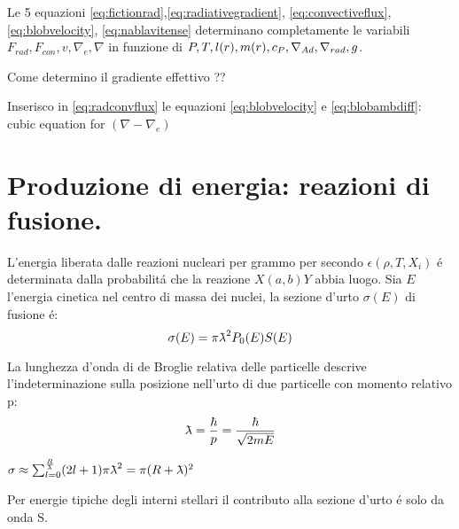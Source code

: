 \documentclass[../main.tex]{subfiles}
\begin{document}
\begin{errata}

Le 5 equazioni \eqref{eq:fictionrad},\eqref{eq:radiativegradient}, \eqref{eq:convectiveflux}, \eqref{eq:blobvelocity}, \eqref{eq:nablavitense} determinano completamente le variabili $F_{rad}, F_{con}, v, \nabla_e, \nabla$ in funzione di $P,T,l(r),m(r),c_P,\nabla_{Ad}{},\nabla_{rad}{},g$.

\end{errata}

\begin{workout}{Come determino il gradiente effettivo ??}

\end{workout}

\begin{workout}
Inserisco in \eqref{eq:radconvflux} le equazioni \eqref{eq:blobvelocity} e \eqref{eq:blobambdiff}: cubic equation for $(\nabla-\nabla_e)$
\end{workout}

{\let\clearpage\relax\let\cleardoublepage\relax
\chapter{Produzione di energia: reazioni di fusione.}
}

L'energia liberata dalle reazioni nucleari per grammo per secondo $\epsilon(\rho,T,X_i)$ \'e determinata dalla probabilit\'a che la reazione $X(a,b)Y$ abbia luogo. Sia $E$ l'energia cinetica nel centro di massa dei nuclei, la sezione d'urto $\sigma(E)$ di fusione \'e:
\begin{equation}
\sigma(E)=\pi\lambdabar^2P_0(E)S(E)
\end{equation}

La lunghezza d'onda di de Broglie relativa delle particelle descrive l'indeterminazione sulla posizione nell'urto di due particelle con momento relativo p:
\begin{equation}
\lambdabar=\frac{\hbar}{p}=\frac{\hbar}{\sqrt{2mE}}
\end{equation}

\begin{workout}
$\sigma\approx\sum_{l=0}^{\frac{R}{\lambdabar}}(2l+1)\pi\lambdabar^2=\pi(R+\lambdabar)^2$

Per energie tipiche degli interni stellari il contributo alla sezione d'urto \'e solo da onda S.

\end{workout}
\end{document}
